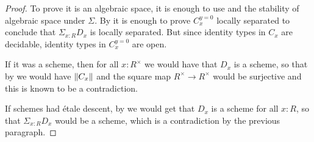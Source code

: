 \begin{proof}
To prove it is an algebraic space, it is enough to use  and the stability of algebraic space under $\Sigma$. By  it is enough to prove $C_x^{y=0}$ locally separated to conclude that $\Sigma_{x:R}D_x$ is locally separated. But since identity types in $C_x$ are decidable, identity types in $C_x^{y=0}$ are open.

If it was a scheme, then for all $x:R^\times$ we would have that $D_x$ is a scheme, so that by  we would have $\lVert C_x \rVert$ and the square map $R^\times\to R^\times$ would be surjective and this is known to be a contradiction.

If schemes had étale descent, by  we would get that $D_x$ is a scheme for all $x:R$, so that $\Sigma_{x:R}D_x$ would be a scheme, which is a contradiction by the previous paragraph.
\end{proof}












